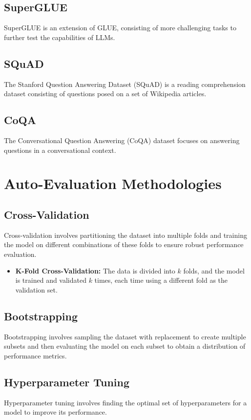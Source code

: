 \subsection{SuperGLUE}
SuperGLUE is an extension of GLUE, consisting of more challenging tasks to further test the capabilities of LLMs.

\subsection{SQuAD}
The Stanford Question Answering Dataset (SQuAD) is a reading comprehension dataset consisting of questions posed on a set of Wikipedia articles.

\subsection{CoQA}
The Conversational Question Answering (CoQA) dataset focuses on answering questions in a conversational context.

\section{Auto-Evaluation Methodologies}

\subsection{Cross-Validation}
Cross-validation involves partitioning the dataset into multiple folds and training the model on different combinations of these folds to ensure robust performance evaluation.

\begin{itemize}
    \item \textbf{K-Fold Cross-Validation:} The data is divided into \( k \) folds, and the model is trained and validated \( k \) times, each time using a different fold as the validation set.
\end{itemize}

\subsection{Bootstrapping}
Bootstrapping involves sampling the dataset with replacement to create multiple subsets and then evaluating the model on each subset to obtain a distribution of performance metrics.

\subsection{Hyperparameter Tuning}
Hyperparameter tuning involves finding the optimal set of hyperparameters for a model to improve its performance.

